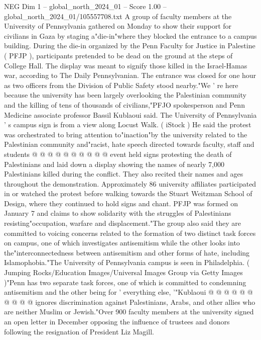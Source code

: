\begin{textsample}{NEG Dim 1 – global\_north\_2024\_01 – Score 1.00 – global\_north\_2024\_01/105557708.txt}  \label{ex:f1_neg_329}
A group of faculty members at the University of Pennsylvania gathered on Monday to show their support for civilians in Gaza by staging a"die-in"where they blocked the entrance to a campus building.
During the die-in organized by the Penn Faculty for Justice in Palestine ( PFJP ), participants pretended to be dead on the ground at the steps of College Hall.
The display was meant to signify those killed in the Israel-Hamas war, according to The Daily Pennsylvanian.
The entrance was closed for one hour as two officers from the Division of Public Safety stood nearby."We ' re here because the university has been largely overlooking the Palestinian community and the killing of tens of thousands of civilians,"PFJO spokesperson and Penn Medicine associate professor Bassil Kublaoui said.
The University of Pennsylvania ' s campus sign is from a view along Locust Walk. ( iStock ) He said the protest was orchestrated to bring attention to"inaction"by the university related to the Palestinian community and"racist, hate speech directed towards faculty, staff and students @ @ @ @ @ @ @ @ @ @ event held signs protesting the death of Palestinians and laid down a display showing the names of nearly 7,000 Palestinians killed during the conflict.
They also recited their names and ages throughout the demonstration.
Approximately 86 university affiliates participated in or watched the protest before walking towards the Stuart Weitzman School of Design, where they continued to hold signs and chant.
PFJP was formed on January 7 and claims to show solidarity with the struggles of Palestinians resisting"occupation, warfare and displacement."The group also said they are committed to voicing concerns related to the formation of two distinct task forces on campus, one of which investigates antisemitism while the other looks into the"interconnectedness between antisemitism and other forms of hate, including Islamophobia."The University of Pennsylvania campus is seen in Philadelphia. ( Jumping Rocks/Education Images/Universal Images Group via Getty Images )"Penn has two separate task forces, one of which is committed to condemning antisemitism and the other being for ' everything else, '"Kublaoui @ @ @ @ @ @ @ @ @ @ ignores discrimination against Palestinians, Arabs, and other allies who are neither Muslim or Jewish."Over 900 faculty members at the university signed an open letter in December opposing the influence of trustees and donors following the resignation of President Liz Magill.

\end{textsample}
